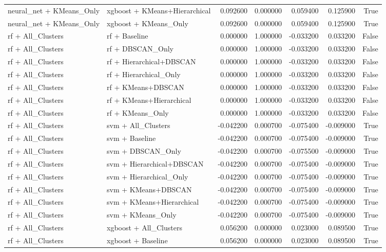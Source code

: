 \begin{tabular}{llrrrrr}
neural_net + KMeans_Only & xgboost + KMeans+Hierarchical & 0.092600 & 0.000000 & 0.059400 & 0.125900 & True \\
neural_net + KMeans_Only & xgboost + KMeans_Only & 0.092600 & 0.000000 & 0.059400 & 0.125900 & True \\
rf + All_Clusters & rf + Baseline & 0.000000 & 1.000000 & -0.033200 & 0.033200 & False \\
rf + All_Clusters & rf + DBSCAN_Only & 0.000000 & 1.000000 & -0.033200 & 0.033200 & False \\
rf + All_Clusters & rf + Hierarchical+DBSCAN & 0.000000 & 1.000000 & -0.033200 & 0.033200 & False \\
rf + All_Clusters & rf + Hierarchical_Only & 0.000000 & 1.000000 & -0.033200 & 0.033200 & False \\
rf + All_Clusters & rf + KMeans+DBSCAN & 0.000000 & 1.000000 & -0.033200 & 0.033200 & False \\
rf + All_Clusters & rf + KMeans+Hierarchical & 0.000000 & 1.000000 & -0.033200 & 0.033200 & False \\
rf + All_Clusters & rf + KMeans_Only & 0.000000 & 1.000000 & -0.033200 & 0.033200 & False \\
rf + All_Clusters & svm + All_Clusters & -0.042200 & 0.000700 & -0.075400 & -0.009000 & True \\
rf + All_Clusters & svm + Baseline & -0.042200 & 0.000700 & -0.075400 & -0.009000 & True \\
rf + All_Clusters & svm + DBSCAN_Only & -0.042200 & 0.000700 & -0.075500 & -0.009000 & True \\
rf + All_Clusters & svm + Hierarchical+DBSCAN & -0.042200 & 0.000700 & -0.075400 & -0.009000 & True \\
rf + All_Clusters & svm + Hierarchical_Only & -0.042200 & 0.000700 & -0.075400 & -0.009000 & True \\
rf + All_Clusters & svm + KMeans+DBSCAN & -0.042200 & 0.000700 & -0.075400 & -0.009000 & True \\
rf + All_Clusters & svm + KMeans+Hierarchical & -0.042200 & 0.000700 & -0.075400 & -0.009000 & True \\
rf + All_Clusters & svm + KMeans_Only & -0.042200 & 0.000700 & -0.075400 & -0.009000 & True \\
rf + All_Clusters & xgboost + All_Clusters & 0.056200 & 0.000000 & 0.023000 & 0.089500 & True \\
rf + All_Clusters & xgboost + Baseline & 0.056200 & 0.000000 & 0.023000 & 0.089500 & True \\

\end{tabular}
